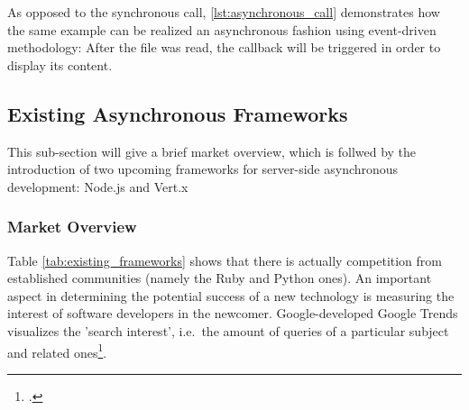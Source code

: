 

As opposed to the synchronous call, \autoref{lst:asynchronous_call} demonstrates
how the same example can be realized an asynchronous fashion using event-driven
methodology: After the file was read, the callback will be triggered in order to
display its content.






\subsection{Existing Asynchronous Frameworks}
\label{existing_frameworks}
This sub-section will give a brief market overview, which is follwed by the
introduction of two upcoming frameworks for server-side asynchronous
development: Node.js and Vert.x


\subsubsection{Market Overview}
\label{frameworks_overview}
\FloatBarrier
Table \ref{tab:existing_frameworks} shows that there is actually competition
from established communities (namely the Ruby and Python ones). An important
aspect in determining the potential success of a new technology is measuring the
interest of software developers in the newcomer. Google-developed Google Trends
visualizes the 'search interest', i.e.\ the amount of queries of a particular
subject and related ones\footcite[Cf.][]{g_trends}.


